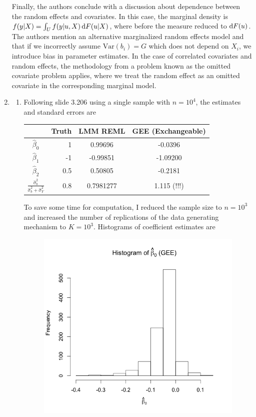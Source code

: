 \documentclass[11pt]{article}
\newcommand{\Var}{\mathrm{Var}}
\begin{document}
\begin{enumerate}
{	 Finally, the authors conclude with a discussion about dependence between the random effects and covariates. In this case, the marginal density is $f(y|X) = \int_U f(y|u,X)\dif F(u|X)$, where before the measure reduced to $\dif F(u)$. The authors mention an alternative marginalized random effects model and that if we incorrectly assume $\Var(b_i) = G$ which does not depend on $X_i$, we introduce bias in parameter estimates. In the case of correlated covariates and random effects, the methodology from a problem known as the omitted covariate problem applies, where we treat the random effect as an omitted covariate in the corresponding marginal model.
	\par}
\newpage
	\item
		\begin{enumerate}
			\item Following slide 3.206 using a single sample with $n=10^4$, the estimates and standard errors are
			\begin{table}[H]
			\centering
			\begin{tabular}{cr|c|c}
				\hfill & Truth & LMM REML & GEE (Exchangeable) \\
				\hline
				$\widehat{\beta}_0$ & 1 & 0.99696 & -0.0396 \\
				$\widehat{\beta}_1$ & -1 & -0.99851 & -1.09200 \\
				$\widehat{\beta}_2$ & 0.5 & 0.50805 & -0.2181 \\
				$\frac{\widehat{\sigma}_b^2}{\widehat{\sigma}^2_b + \widehat{\sigma}_Y^2}$ & 0.8 & 0.7981277 & 1.115 (!!!) \\				
			\end{tabular}
			\end{table}
			To save some time for computation, I reduced the sample size to $n=10^3$ and increased the number of replications of the data generating mechanism to $K=10^3$. Histograms of coefficient estimates are
			\begin{figure}[H]
				\includegraphics[scale=0.4]{Rplot4b0GEE}

\end{figure}
\end{enumerate}
\end{enumerate}
\end{document}

